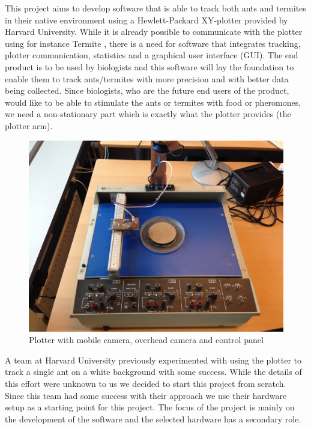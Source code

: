 This project aims to develop software that is able to track both ants and termites in their native environment using a Hewlett-Packard XY-plotter provided by Harvard University. While it is already possible to communicate with the plotter using for instance Termite \cite{termite}, there is a need for software that integrates tracking, plotter communication, statistics and a graphical user interface (GUI). The end product is to be used by biologists and this software will lay the foundation to enable them to track ants/termites with more precision and with better data being collected. Since biologists, who are the future end users of the product, would like to be able to stimulate the ants or termites with food or pheromones, we need a non-stationary part which is exactly what the plotter provides (the plotter arm). 

\begin{figure}
        \centering
        \includegraphics[scale=0.125]{img/plotter}
        \caption{Plotter with mobile camera, overhead camera and control panel}
        \label{fig:plotter}
\end{figure}

A team at Harvard University previously experimented with using the plotter to track a single ant on a white background with some success. While the details of this effort were unknown to us we decided to start this project from scratch. Since this team had some success with their approach we use their hardware setup as a starting point for this project. The focus of the project is mainly on the development of the software and the selected hardware has a secondary role. \\

